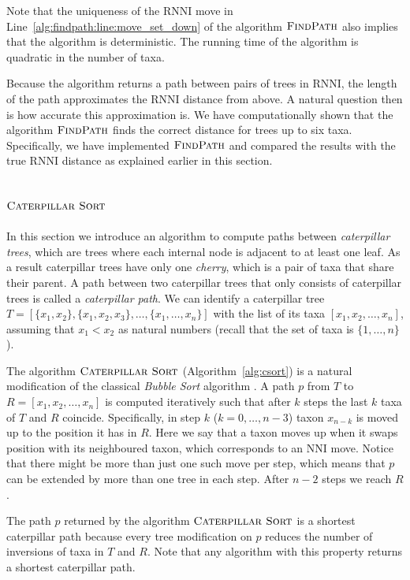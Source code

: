 \documentclass{amsart}
\newcommand{\nni}{\mathrm{NNI}}
\newcommand{\rnni}{\mathrm{RNNI}}
\newcommand{\csort}{\textsc{Caterpillar Sort}}
\newcommand{\findpath}{\textsc{FindPath}}
\begin{document}
Note that the uniqueness of the $\rnni$ move in Line~\ref{alg:findpath:line:move_set_down} of the algorithm $\findpath$ also implies that the algorithm is deterministic.
The running time of the algorithm is quadratic in the number of taxa.

Because the algorithm returns a path between pairs of trees in $\rnni$, the length of the path approximates the $\rnni$ distance from above.
A natural question then is how accurate this approximation is.
We have computationally shown that the algorithm $\findpath$ finds the correct distance for trees up to six taxa.
Specifically, we have implemented $\findpath$ \autocite{Collienne2019} and compared the results with the true $\rnni$ distance as explained earlier in this section.


\subsection{$\csort$}
\label{section:alg_csort}

In this section we introduce an algorithm to compute paths between \emph{caterpillar trees}, which are trees where each internal node is adjacent to at least one leaf.
As a result caterpillar trees have only one \emph{cherry}, which is a pair of taxa that share their parent.
A path between two caterpillar trees that only consists of caterpillar trees is called a \emph{caterpillar path}.
We can identify a caterpillar tree $T = [\{x_1, x_2\}, \{x_1, x_2, x_3\}, \ldots, \{x_1, \ldots, x_n\}]$ with the list of its taxa $[x_1, x_2, \ldots, x_n]$, assuming that $x_1 < x_2$ as natural numbers (recall that the set of taxa is $\{1, \ldots, n\}$).

The algorithm $\csort$ (Algorithm~\ref{alg:csort}) is a natural modification of the classical \emph{Bubble Sort} algorithm \autocite{Knuth1997-pi}.
A path $p$ from $T$ to $R= [x_1, x_2, \ldots, x_n]$ is computed iteratively such that after $k$ steps the last $k$ taxa of $T$ and $R$ coincide.
Specifically, in step $k$ ($k = 0, \ldots, n-3$) taxon $x_{n-k}$ is moved up to the position it has in $R$.
Here we say that a taxon moves up when it swaps position with its neighboured taxon, which corresponds to an $\nni$ move.
Notice that there might be more than just one such move per step, which means that $p$ can be extended by more than one tree in each step.
After $n-2$ steps we reach $R$.

The path $p$ returned by the algorithm $\csort$ is a shortest caterpillar path because every tree modification on $p$ reduces the number of inversions of taxa in $T$ and $R$.
Note that any algorithm with this property returns a shortest caterpillar path.
\end{document}
